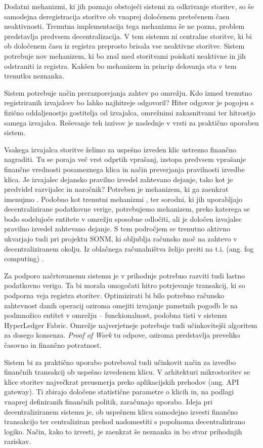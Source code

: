 \documentclass[a4paper, 12pt]{book}
\begin{document}
Dodatni mehanizmi, ki jih poznajo obstoječi sistemi za odkrivanje storitev, so še samodejna deregistracija storitve ob vnaprej določenem pretečenem času neaktivnosti.
Trenutna implementacija tega mehanizma še ne pozna, problem predstavlja predvsem decentralizacija.
V tem sistemu ni centralne storitve, ki bi ob določenem času iz registra preprosto brisala vse neaktivne storitve.
Sistem potrebuje nov mehanizem, ki bo znal med storitvami poiskati neaktivne in jih odstraniti iz registra.
Kakšen bo mehanizem in princip delovanja sta v tem trenutku neznanka.

Sistem potrebuje način prerazporejanja zahtev po omrežju.
Kdo izmed trenutno registriranih izvajalcev bo lahko najhitreje odgovoril?
Hiter odgovor je pogojen s fizično oddaljenostjo gostitelja od izvajalca, omrežnimi zakasnitvami ter hitrostjo samega izvajalca. Reševanje teh izzivov je naslednje v vrsti za praktično uporaben sistem.


Vsakega izvajalca storitve želimo za uspešno izveden klic ustrezno finančno nagraditi. Tu se poraja več vrst odprtih vprašanj, izstopa predvsem vprašanje finančne vrednosti posameznega klica in način preverjanja pravilnosti izvedbe klica.
Je izvajalec dejansko pravilno izvedel zahtevano dejanje, tako kot je predvidel razvijalec in naročnik?
Potreben je mehanizem, ki ga zaenkrat imenujmo .
Podobno kot trenutni mehanizmi ,  ter sorodni, ki jih uporabljajo decentralizirane podatkovne verige, potrebujemo mehanizem, preko katerega se bodo sodelujoče entitete v omrežju sposobne odločiti, ali je določen izvajalec pravilno izvedel zahtevano dejanje.
S tem področjem se trenutno aktivno ukvarjajo tudi pri projektu SONM, ki obljublja računsko moč na zahtevo v decentraliziranem okolju. Iz oblačnega računalništva želijo preiti na t.i.  (ang. fog computing) \cite{Sonm}.

Za podporo načrtovanemu sistemu je v prihodnje potrebno razviti tudi lastno podatkovno verigo.
Ta bi morala omogočati hitro potrjevanje transakcij, ki so podporna veja registra storitev.
Optimizirati bi bilo potrebno računsko zahtevnost danih operacij oziroma omejiti izvajanje pametnih pogodb le na podmnožico entitet v omrežju -- funckionalnost, podobna tisti v sistemu HyperLedger Fabric.
Omrežje najverjetneje potrebuje tudi učinkovitejši algoritem za dosego konsenza.
\textit{Proof of Work} tu odpove, oziroma predstavlja preveliko časovno in finančno potratnost.

Sistem bi za praktično uporabo potreboval tudi učinkovit način za izvedbo finančnih transakcij ob uspešno izvedenem klicu.
V arhitekturi mikrostoritev se klice storitev največkrat preusmerja preko aplikacijskih prehodov (ang. API gateway).
Ti zbirajo določene statistične parametre o klicih in, na podlagi vnaprej definiranih finančnih politik, zaračunajo uporabo.
Ideja pri decentraliziranem sistemu je, ob uspešnem klicu samodejno izvesti finančno transakcijo ter centraliziran prehod nadomestiti s popolnoma decentralizirano logiko.
Način, kako to izvesti, je zaenkrat še neznanka in bo stvar prihodnjih raziskav.
\end{document}
